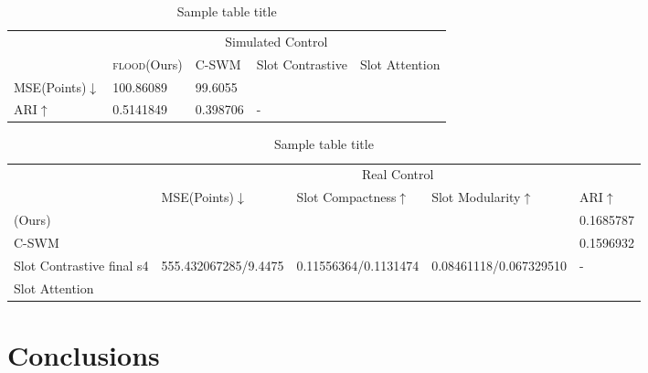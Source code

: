 \documentclass{article}
\begin{document}
\begin{table}
  \caption{Sample table title}
  \label{sample-table}
  \centering
  \begin{tabular}{lllll}
    \toprule
    \multicolumn{1}{c}{} & \multicolumn{4}{c}{Simulated Control} \\
    \cmidrule(r){2-5}  
      & \textsc{flood}(Ours)      & C-SWM    & Slot Contrastive     & Slot Attention  \\
    \midrule
   MSE(Points)$\downarrow$  & 100.86089 &  99.6055  & &      \\
   \midrule
    ARI$\uparrow$     &  0.5141849  & 0.398706  & - &   \\
    \bottomrule
  \end{tabular}
\end{table}

\begin{table}
  \caption{Sample table title}
  \label{sample-table}
  \centering
  \begin{tabular}{lllll}
    \toprule
    \multicolumn{1}{c}{} & \multicolumn{4}{c}{Real Control} \\
    \cmidrule(r){2-5}  
      & MSE(Points)$\downarrow$     & Slot Compactness$\uparrow$     & Slot Modularity$\uparrow$      & ARI$\uparrow$   \\
    \midrule
    (Ours) &  & & &    0.1685787 \\
    C-SWM &       &   &&  0.1596932    \\
    Slot Contrastive final s4 & 555.432067285/9.4475     &    0.11556364/0.1131474 &0.08461118/0.067329510 & - \\ 
    Slot Attention &  & &   \\
    \bottomrule
  \end{tabular}
\end{table}


\section{Conclusions}\label{sec:conclusions}




\end{document}
